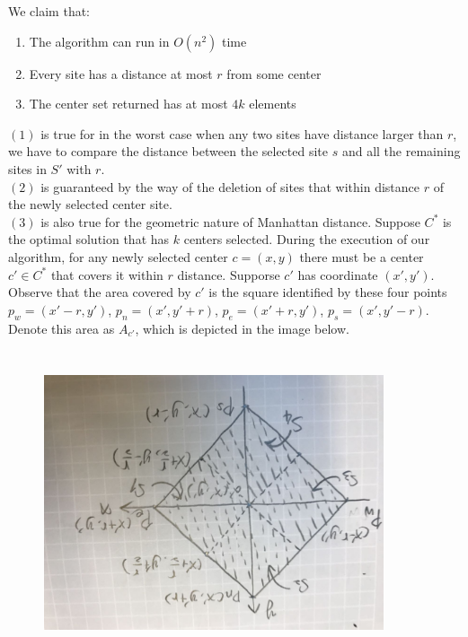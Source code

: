\documentclass[10pt]{article}
\begin{document}
We claim that:
\begin{enumerate}
	\item The algorithm can run in $O(n^2)$ time
	\item Every site has a distance at most $r$ from some center
	\item The center set returned has at most $4k$ elements
\end{enumerate}
$(1)$ is true for in the worst case when any two sites have distance larger than $r$, we have to compare the distance between the selected site $s$ and all the remaining sites in $S'$ with $r$.\\
$(2)$ is guaranteed by the way of the deletion of sites that within distance $r$ of the newly selected center site.\\
$(3)$ is also true for the geometric nature of Manhattan distance. Suppose $C^*$ is the optimal solution that has $k$ centers selected. During the execution of our algorithm, for any newly selected center $c = (x, y)$ there must be a center $c' \in C^*$ that covers it within $r$ distance. Supporse $c'$ has coordinate $(x', y')$. Observe that the area covered by $c'$ is the square identified by these four points $p_w = (x' - r, y')$, $p_n = (x', y' + r)$, $p_e = (x' + r, y')$, $p_s = (x', y' - r)$. Denote this area as $A_{c'}$, which is depicted in the image below.\\
\begin{figure}[h]
\includegraphics[width=10cm, height=9cm]{area}
\end{figure}
\end{document}
